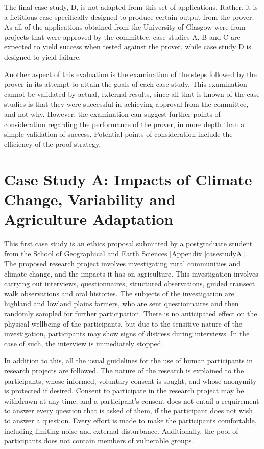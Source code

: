 \documentclass{l4proj}
\begin{document}
The final case study, D, is not adapted from this set of applications. Rather, it is a fictitious case specifically designed to produce certain output from the prover. As all of the applications obtained from the University of Glasgow were from projects that were approved by the committee, case studies A, B and C are expected to yield success when tested against the prover, while case study D is designed to yield failure. 

Another aspect of this evaluation is the examination of the steps followed by the prover in its attempt to attain the goals of each case study. This examination cannot be validated by actual, external results, since all that is known of the case studies is that they were successful in achieving approval from the committee, and not why. However, the examination can suggest further points of consideration regarding the performance of the prover, in more depth than a simple validation of success. Potential points of consideration include the efficiency of the proof strategy. 

\section{Case Study A: Impacts of Climate Change, Variability and Agriculture Adaptation}

This first case study is an ethics proposal submitted by a postgraduate student from the School of Geographical and Earth Sciences [Appendix \ref{casestudyA}]. The proposed research project involves investigating rural communities and climate change, and the impacts it has on agriculture. This investigation involves carrying out interviews, questionnaires, structured observations, guided transect walk observations and oral histories. The subjects of the investigation are highland and lowland plains farmers, who are sent questionnaires and then randomly sampled for further participation. There is no anticipated effect on the physical wellbeing of the participants, but due to the sensitive nature of the investigation, participants may show signs of distress during interviews. In the case of such, the interview is immediately stopped. 

In addition to this, all the usual guidelines for the use of human participants in research projects are followed. The nature of the research is explained to the participants, whose informed, voluntary consent is sought, and whose anonymity is protected if desired. Consent to participate in the research project may be withdrawn at any time, and a participant's consent does not entail a requirement to answer every question that is asked of them, if the participant does not wish to answer a question. Every effort is made to make the participants comfortable, including limiting noise and external disturbance. Additionally, the pool of participants does not contain members of vulnerable groups. 
\end{document}
